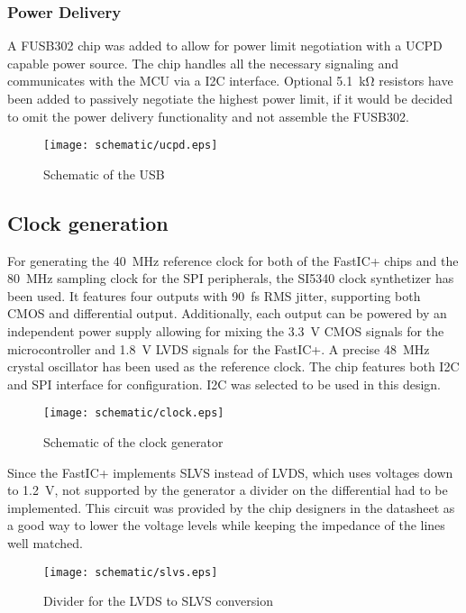\subsubsection{Power Delivery}
A FUSB302 chip was added to allow for power limit negotiation with a UCPD capable power source. The chip handles all the necessary signaling and communicates with the MCU via a I2C interface. Optional \SI{5.1}{\kilo\ohm} resistors have been added to passively negotiate the highest power limit, if it would be decided to omit the power delivery functionality and not assemble the FUSB302.
\FloatBarrier
\begin{figure}[htp!]
    \centering
    \texttt{[image: schematic/ucpd.eps]}
    \caption{Schematic of the USB}
    \label{fig:schem_ucpd}
\end{figure}
\FloatBarrier
\subsection{Clock generation}
For generating the \SI{40}{\mega\hertz} reference clock for both of the FastIC+ chips and the \SI{80}{\mega\hertz} sampling clock for the SPI peripherals, the SI5340 clock synthetizer has been used. It features four outputs with \SI{90}{\femto\second} RMS jitter, supporting both CMOS and differential output. Additionally, each output can be powered by an independent power supply allowing for mixing the \SI{3.3}{\volt} CMOS signals for the microcontroller and \SI{1.8}{\volt} LVDS signals for the FastIC+. A precise \SI{48}{\mega\hertz} crystal oscillator has been used as the reference clock. The chip features both I2C and SPI interface for configuration. I2C was selected to be used in this design.

\FloatBarrier
\begin{figure}[htp!]
    \centering
    \texttt{[image: schematic/clock.eps]}
    \caption{Schematic of the clock generator}
    \label{fig:schem_clock}
\end{figure}
\FloatBarrier

Since the FastIC+ implements SLVS instead of LVDS, which uses voltages down to \SI{1.2}{\volt}, not supported by the generator a divider on the differential had to be implemented. This circuit was provided by the chip designers in the datasheet as a good way to lower the voltage levels while keeping the impedance of the lines well matched. 
\FloatBarrier
\begin{figure}[htp!]
    \centering
    \texttt{[image: schematic/slvs.eps]}
    \caption{Divider for the LVDS to SLVS conversion}
    \label{fig:schem_slvs}
\end{figure}
\FloatBarrier

